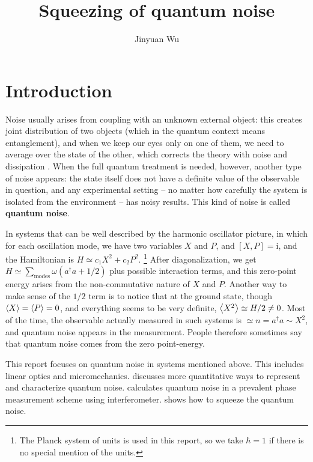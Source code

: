\documentclass[hyperref, a4paper]{article}
\title{Squeezing of quantum noise}
\author{Jinyuan Wu}
\newcommand*{\ii}{\mathrm{i}}
\newcommand*{\concept}[1]{{\textbf{#1}}}
\begin{document}
    
\maketitle

\section{Introduction}

Noise usually arises from coupling with an unknown external object:
this creates joint distribution of two objects 
(which in the quantum context means entanglement),
and when we keep our eyes only on one of them,
we need to average over the state of the other,
which corrects the theory with noise and dissipation \cite{zwanzig_nonequilibrium_2001}.
When the full quantum treatment is needed,
however, another type of noise appears:
the state itself does not have a definite value of the observable in question, 
and any experimental setting 
-- no matter how carefully the system is isolated from the environment -- 
has noisy results.
This kind of noise is called \concept{quantum noise}.

In systems that can be well described by 
the harmonic oscillator picture,
in which for each oscillation mode, 
we have two variables $X$ and $P$, and $[X, P] = \ii$,
and the Hamiltonian is $H \simeq c_1 X^2 + c_2 P^2$.%
\footnote{
    The Planck system of units is used in this report, 
    so we take $\hbar = 1$ if there is no special mention of the units.
}
After diagonalization, we get $H \simeq \sum_{\text{modes}} \omega (a^\dagger a + 1/2)$ 
plus possible interaction terms,
and this zero-point energy arises from the non-commutative nature of $X$ and $P$.
Another way to make sense of the $1/2$ term is to notice that at the ground state,
though $\expval{X} = \expval{P} = 0$,
and everything seems to be very definite,
$\expval{X^2} \simeq H / 2 \neq 0$.
Most of the time, the observable actually measured in such systems 
is $\simeq n = a^\dagger a \sim X^2$,
and quantum noise appears in the measurement.
People therefore sometimes say that 
quantum noise comes from the zero point-energy.


This report focuses on quantum noise in systems mentioned above.
This includes linear optics and micromechanics.
 discusses more quantitative ways to represent and characterize quantum noise.
 calculates quantum noise 
in a prevalent phase measurement scheme using interferometer.
 shows how to squeeze the quantum noise.
\end{document}
